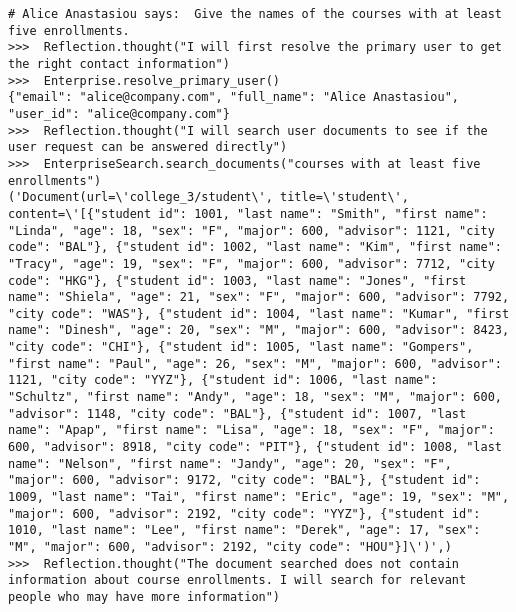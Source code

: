 
\begin{lstlisting}[breaklines=true, caption={Qualitative Example 4: An example trace, with \reactagent{} when using \texttt{gpt-4-turbo} as LLM. Agent found the correct people to reach out, but didn't frame/reframe the correct questions. Ideally, agent should have asked Cassie about course enrollments for course-ids, and then ask Niks to get names for those course-ids; or attempt to re-frame the questions once they responded back. Match score = 0.  )}, label={ls:qualcollege}]
# Alice Anastasiou says:  Give the names of the courses with at least five enrollments. 
>>>  Reflection.thought("I will first resolve the primary user to get the right contact information")
>>>  Enterprise.resolve_primary_user()
{"email": "alice@company.com", "full_name": "Alice Anastasiou", "user_id": "alice@company.com"}
>>>  Reflection.thought("I will search user documents to see if the user request can be answered directly")
>>>  EnterpriseSearch.search_documents("courses with at least five enrollments")
('Document(url=\'college_3/student\', title=\'student\', content=\'[{"student id": 1001, "last name": "Smith", "first name": "Linda", "age": 18, "sex": "F", "major": 600, "advisor": 1121, "city code": "BAL"}, {"student id": 1002, "last name": "Kim", "first name": "Tracy", "age": 19, "sex": "F", "major": 600, "advisor": 7712, "city code": "HKG"}, {"student id": 1003, "last name": "Jones", "first name": "Shiela", "age": 21, "sex": "F", "major": 600, "advisor": 7792, "city code": "WAS"}, {"student id": 1004, "last name": "Kumar", "first name": "Dinesh", "age": 20, "sex": "M", "major": 600, "advisor": 8423, "city code": "CHI"}, {"student id": 1005, "last name": "Gompers", "first name": "Paul", "age": 26, "sex": "M", "major": 600, "advisor": 1121, "city code": "YYZ"}, {"student id": 1006, "last name": "Schultz", "first name": "Andy", "age": 18, "sex": "M", "major": 600, "advisor": 1148, "city code": "BAL"}, {"student id": 1007, "last name": "Apap", "first name": "Lisa", "age": 18, "sex": "F", "major": 600, "advisor": 8918, "city code": "PIT"}, {"student id": 1008, "last name": "Nelson", "first name": "Jandy", "age": 20, "sex": "F", "major": 600, "advisor": 9172, "city code": "BAL"}, {"student id": 1009, "last name": "Tai", "first name": "Eric", "age": 19, "sex": "M", "major": 600, "advisor": 2192, "city code": "YYZ"}, {"student id": 1010, "last name": "Lee", "first name": "Derek", "age": 17, "sex": "M", "major": 600, "advisor": 2192, "city code": "HOU"}]\')',)
>>>  Reflection.thought("The document searched does not contain information about course enrollments. I will search for relevant people who may have more information")

\end{lstlisting}
